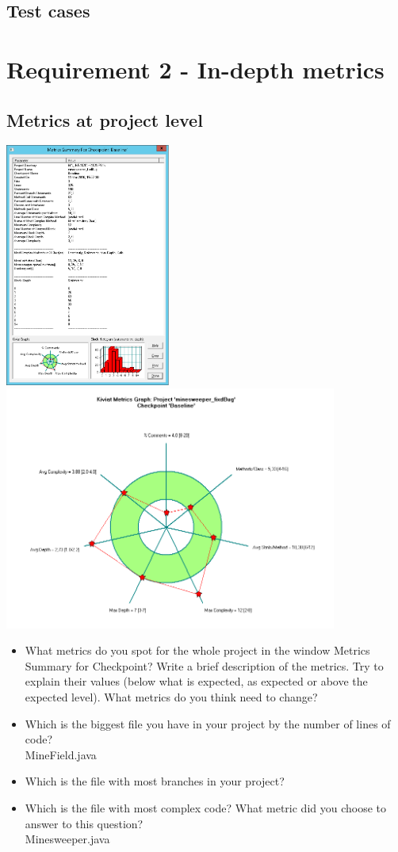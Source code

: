 \documentclass[UKenglish]{article}  %
\begin{document}
\subsection{Test cases}

\section{Requirement 2 - In-depth metrics}

\subsection{Metrics at project level}
\includegraphics[height=8cm]{metric_summary}
\includegraphics[height=8cm]{kiviat_diagram_baseline}
\begin{itemize}
\item What metrics do you spot for the whole project in the window Metrics Summary for Checkpoint? Write a brief description of the metrics. Try to explain their values (below what is expected, as expected or above the expected level). What metrics do you think need to change?\\
\item Which is the biggest file you have in your project by the number of lines of code? \\
MineField.java
\item Which is the file with most branches in your project?\\
\item Which is the file with most complex code? What metric did you choose to answer to this question?\\
Minesweeper.java
\end{itemize}
\end{document}
